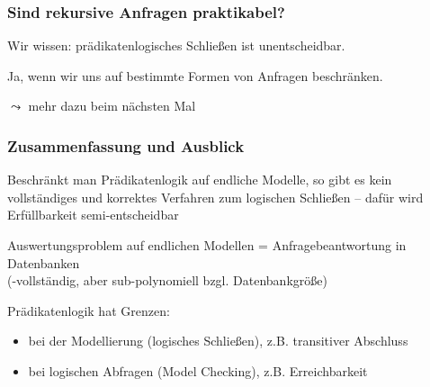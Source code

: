 \documentclass[aspectratio=1610,onlymath]{beamer}
\begin{document}
\begin{frame}\frametitle{Sind rekursive Anfragen praktikabel?}

Wir wissen: prädikatenlogisches Schließen ist unentscheidbar.
\bigskip

\bigskip\pause

\alert{Ja, wenn wir uns auf bestimmte Formen von Anfragen beschränken.}
\bigskip

$\leadsto$ mehr dazu beim nächsten Mal

\end{frame}


\begin{frame}\frametitle{Zusammenfassung und Ausblick}

Beschränkt man Prädikatenlogik auf endliche Modelle, so gibt es kein vollständiges und korrektes Verfahren zum logischen Schließen -- dafür wird Erfüllbarkeit semi-entscheidbar\bigskip

Auswertungsproblem auf endlichen Modellen = Anfragebeantwortung in Datenbanken\\
(\PSpace-vollständig, aber sub-polynomiell bzgl. Datenbankgröße)\bigskip

Prädikatenlogik hat Grenzen: 
\begin{itemize}
\item bei der Modellierung (logisches Schließen), z.B. transitiver Abschluss
\item bei logischen Abfragen (Model Checking), z.B. Erreichbarkeit
\end{itemize}\bigskip


\end{frame}

% 
% 
% 
% 
% 
% 


% 
% 
\end{document}
